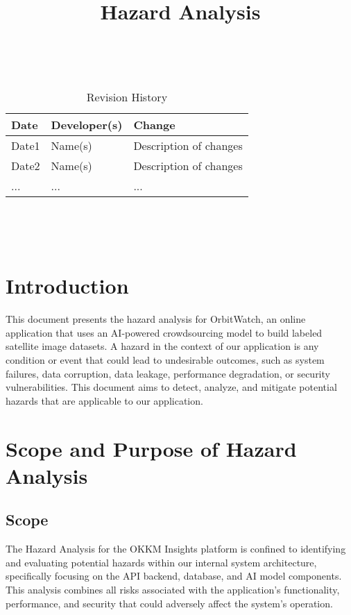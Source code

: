 \documentclass{article}
\title{Hazard Analysis\\\progname}
\author{\authname}
\date{}
\begin{document}
\maketitle
\thispagestyle{empty}

~\newpage


\begin{table}[hp]
\caption{Revision History} \label{TblRevisionHistory}
\begin{tabularx}{\textwidth}{llX}
\toprule
\textbf{Date} & \textbf{Developer(s)} & \textbf{Change}\\
\midrule
Date1 & Name(s) & Description of changes\\
Date2 & Name(s) & Description of changes\\
... & ... & ...\\
\bottomrule
\end{tabularx}
\end{table}

~\newpage

\tableofcontents

~\newpage



\section{Introduction}
This document presents the hazard analysis for OrbitWatch, an online application that uses an AI-powered crowdsourcing model to build labeled satellite image datasets.
A hazard in the context of our application is any condition or event that could lead to undesirable outcomes, such as system failures, data corruption, data leakage, performance degradation, or security vulnerabilities.
This document aims to detect, analyze, and mitigate potential hazards that are applicable to our application.

\section{Scope and Purpose of Hazard Analysis}

\subsection{Scope}
The Hazard Analysis for the OKKM Insights platform is confined to identifying and evaluating potential hazards within our internal system architecture, specifically focusing on the API backend, database, and AI model components. This analysis combines all risks associated with the application's functionality, performance, and security that could adversely affect the system's operation.
\end{document}
